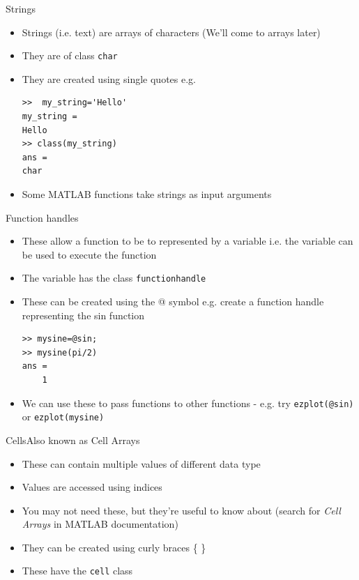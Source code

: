 \documentclass{beamer}
\begin{document}
\begin{frame}[fragile]{Strings}
	\begin{itemize}
		\item Strings (i.e. text) are arrays of characters (We'll come to arrays later)
		\item They are of class \texttt{char}
		\item They are created using single quotes e.g.
		
		\begin{lstlisting}[style=Matlab-editor]
>>  my_string='Hello'
my_string = 
Hello
>> class(my_string)
ans = 
char
		\end{lstlisting} 	%
		\item Some MATLAB functions take strings as input arguments
	\end{itemize}
\end{frame}

\begin{frame}[fragile]{Function handles}
	\begin{itemize}
		\item These allow a function to be to represented by a variable i.e. the variable can be used to execute the function
		\item The variable has the class \texttt{function\textunderscore handle}
		\item These can be created using the @ symbol e.g. create a function handle representing the sin function

		\begin{lstlisting}[style=Matlab-editor]
>> mysine=@sin;
>> mysine(pi/2)
ans =
    1
		\end{lstlisting}
		\item We can use these to pass functions to other functions - e.g. try \lstinline[style=Matlab-editor]!ezplot(@sin)! or \lstinline[style=Matlab-editor]!ezplot(mysine)!
	\end{itemize}
\end{frame}

\begin{frame}{Cells}{Also known as Cell Arrays}
	\begin{itemize}
		\item These can contain multiple values of different data type
		\item Values are accessed using indices
		\item You may not need these, but they're useful to know about (search for \emph{Cell Arrays} in MATLAB documentation)
		\item They can be created using curly braces \{ \}
		\item These have the \texttt{cell} class
	\end{itemize}
\end{frame}
\end{document}
